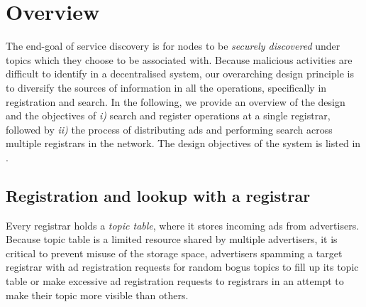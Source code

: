 
\section{Overview}

The end-goal of service discovery is for nodes to be \textit{securely discovered} under topics which they choose to be associated with. Because malicious activities are difficult to identify in a decentralised system, our overarching design principle is to diversify the sources of information in all the operations, specifically in registration and search. In the following, we provide an overview of the design and the objectives of \textit{i)} search and register operations at a single registrar, followed by \textit{ii)} the process of distributing ads and performing search across multiple registrars in the network. The design objectives of the system is listed in .


\subsection{Registration and lookup with a registrar}

Every registrar holds a \emph{topic table}, where it stores incoming ads from advertisers. Because topic table is a limited resource shared by multiple advertisers, it is critical to prevent misuse of the storage space, \eg advertisers spamming a target registrar with ad registration requests for random bogus topics to fill up its topic table or make excessive ad registration requests to registrars in an attempt to make their topic more visible than others.

